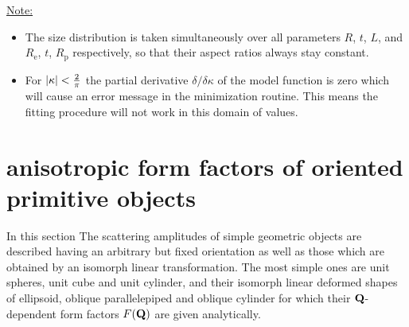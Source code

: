 \vspace{5mm}

\underline{Note:}
\begin{itemize}
\item The size distribution is taken simultaneously over all parameters $R$, $t$, $L$, and $R_\mathrm{e}$, $t$, $R_\mathrm{p}$ respectively, so that their aspect ratios always stay constant.
\item For $\abs{\kappa}<\frac{2}{\pi}$ the partial derivative $\delta /\delta\kappa$ of the model function is zero which will cause an error message in the minimization routine. This means the fitting procedure will not work in this domain of values.
\end{itemize}


\clearpage
\section{anisotropic form factors of oriented primitive objects}
\label{ch:OPO}

In this section The scattering amplitudes of simple geometric objects are described having an arbitrary but fixed orientation as well as those which are obtained by an isomorph linear transformation. The most simple ones are unit spheres, unit cube and unit cylinder, and their isomorph linear deformed shapes of ellipsoid,  oblique parallelepiped and  oblique cylinder for which their $\B{Q}$-dependent form factors $F(\B{Q})$ are given analytically.

